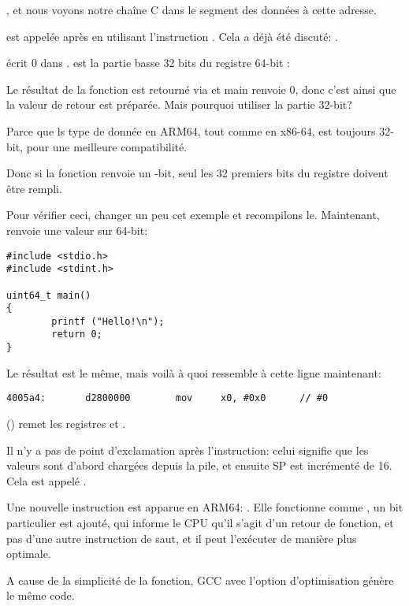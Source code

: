 , et nous voyons notre chaîne C  dans le  segment
des données à cette adresse.


\puts est appelée après en utilisant l'instruction . Cela a déjà été discuté: .

\MOV écrit 0 dans .
 est la partie basse 32 bits du registre 64-bit :



Le résultat de la fonction est retourné via  et main renvoie 0, donc c'est ainsi que la valeur
de retour est préparée.
Mais pourquoi utiliser la partie 32-bit?

Parce que ls type de donnée \Tint en ARM64, tout comme en x86-64, est toujours 32-bit, pour une
meilleure compatibilité.

Donc si la fonction renvoie un -bit, seul les 32 premiers bits du registre  doivent
être rempli.

Pour vérifier ceci, changer un peu cet exemple et recompilons le.
Maintenant, \main renvoie une valeur sur 64-bit:

\begin{lstlisting}[caption=\main renvoie une valeur de type \TT{uint64\_t} type,style=customc]
#include <stdio.h>
#include <stdint.h>

uint64_t main()
{
        printf ("Hello!\n");
        return 0;
}
\end{lstlisting}

Le résultat est le même, mais voilà à quoi ressemble \MOV à cette ligne maintenant:

\begin{lstlisting}[caption=GCC 4.8.1 \NonOptimizing + objdump]
  4005a4:       d2800000        mov     x0, #0x0      // #0
\end{lstlisting}


 () remet les registres  et .

Il n'y a pas de point d'exclamation après l'instruction: celui signifie que les valeurs sont
d'abord chargées depuis la pile, et ensuite \ac{SP} est incrémenté de 16.
Cela est appelé .

Une nouvelle instruction est apparue en ARM64: \RET.
Elle fonctionne comme , un  bit particulier est ajouté, qui informe le \ac{CPU}
qu'il s'agit d'un retour de fonction, et pas d'une autre instruction de saut, et il peut l'exécuter
de manière plus optimale. 

A cause de la simplicité de la fonction, GCC avec l'option d'optimisation génère le même code.
